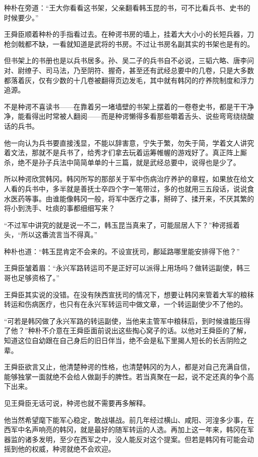 种朴在旁道：“王大你看看这书架，父亲翻看韩玉昆的书，可不比看兵书、史书的时候要少。”

王舜臣顺着种朴的手指看过去。在种谔书房的墙上，挂着大大小小的长短兵器，刀枪剑戟都不缺，一看就知道是武将的书房。不过让书房名副其实的书架也是有的。

但书架上的书册也是以兵书居多。孙、吴二子的兵书自不必说，三韬六略、唐李问对、尉缭子、司马法，乃至阴符、握奇，甚至还有武经总要中的几卷，只是大多数都落着灰，仅有少数的十几卷被翻得页边发毛，其中就有韩冈的疗养院制度和浮力追源。

不是种谔不喜读书——在靠着另一堵墙壁的书架上摆着的一卷卷史书，都是干干净净，能看得出时常被人翻阅——而是种谔懒得多看那些嚼着舌头、说些弯弯绕绕酸话的兵书。

他一向认为兵书要直接浅显，不能以辞害意，宁失于繁，勿失于简，学着文人讲究着文法，那就不是兵书了，给秀才们拿去玩着运筹帷幄的游戏好了。真正阵上厮杀，绝不是孙子兵法中简简单单的十三篇，就是武经总要中，说得也是少了。

所以种谔欣赏韩冈。韩冈所写的那部关于军中伤病治疗养护的章程，如果放在给文人看的兵书中，多半就是善抚士卒四个字一笔带过，多的也就用三五段话，说说食水医药等事。由谁能像韩冈一般，将军中医疗之事，掰碎了、揉开来，不厌其繁的将小到洗手、吐痰的事都细细写来？

“不过军中讲究的就是说一不二，韩玉昆当真来了，可能屈居人下？”种谔摇着头，“所以这番流言当不得真。”

种朴也道：“韩玉昆肯定不会来的。不设宣抚司，鄜延路哪里能安排得下他？”

王舜臣皱着眉：“永兴军路转运司不是正好可以派得上用场吗？做转运副使，韩三哥也足够资格了。”

王舜臣其实说的没错。在没有陕西宣抚司的情况下，想要让韩冈来管着大军的粮秣转运和伤病医疗，也只有在永兴军转运司中做文章，一个转运副使少不了他的。

“可若是韩冈做了永兴军路的转运副使，当他来主管军中粮秣后，到时候谁能压得了他？”种朴不介意在王舜臣面前说出这些掏心窝子的话。以他对王舜臣的了解，知道这位自幼跟在自己身后的旧日伴当，绝不会是私下里揭人短长的长舌阴险之辈。

王舜臣欲言又止，他清楚种谔的性格，也清楚韩冈的为人，都是对自己充满自信，能够独掌一面就绝不会给人做副手的脾性。若当真聚在一起，说不定还真的争个高下出来。

见王舜臣无话可说，种谔也就不需要再多解释。

他当然希望麾下能军心稳定，敢战堪战。前几年经过横山、咸阳、河湟多少事，在西军中名声响亮的韩冈，就是最好的随军转运的人选。再加上这一年来，韩冈在军器监的诸多发明，至少在西军之中，没人能反对这个提案。但若是韩冈有可能会动摇到他的权威，种谔就绝不会欢迎。

